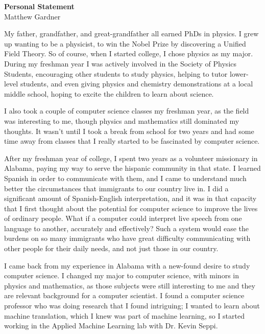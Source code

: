 \documentclass[onecolumn, 12pt]{article}
\begin{document}
\pagestyle{empty}

\begin{center}
  \textbf{Personal Statement}\\
  Matthew Gardner
\end{center}

My father, grandfather, and great-grandfather all earned PhDs in physics.  I
grew up wanting to be a physicist, to win the Nobel Prize by discovering a
Unified Field Theory.  So of course, when I started college, I chose physics as
my major.  During my freshman year I was actively involved in the Society of
Physics Students, encouraging other students to study physics, helping to tutor
lower-level students, and even giving physics and chemistry demonstrations at a
local middle school, hoping to excite the children to learn about science.

I also took a couple of computer science classes my freshman year, as the field
was interesting to me, though physics and mathematics still dominated my
thoughts.  It wasn't until I took a break from school for two years and had
some time away from classes that I really started to be fascinated by computer
science.

After my freshman year of college, I spent two years as a volunteer missionary
in Alabama, paying my way to serve the hispanic community in that state.  I
learned Spanish in order to communicate with them, and I came to understand
much better the circumstances that immigrants to our country live in.  I did a
significant amount of Spanish-English interpretation, and it was in that
capacity that I first thought about the potential for computer science to
improve the lives of ordinary people.  What if a computer could interpret live
speech from one language to another, accurately and effectively?  Such a system
would ease the burdens on so many immigrants who have great difficulty
communicating with other people for their daily needs, and not just those in
our country.

I came back from my experience in Alabama with a new-found desire to study
computer science.  I changed my major to computer science, with minors in
physics and mathematics, as those subjects were still interesting to me and
they are relevant background for a computer scientist.  I found a computer
science professor who was doing research that I found intriguing; I wanted to
learn about machine translation, which I knew was part of machine learning, so
I started working in the Applied Machine Learning lab with Dr. Kevin Seppi.
\end{document}
